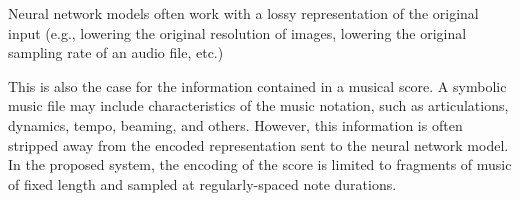 
Neural network models often work with a lossy representation
of the original input (e.g., lowering the original
resolution of images, lowering the original sampling rate of
an audio file, etc.)

This is also the case for the information contained in a
musical score. A symbolic music file may include
characteristics of the music notation, such as
articulations, dynamics, tempo, beaming, and others.
However, this information is often stripped away from the
encoded representation sent to the neural network model. In
the proposed system, the encoding of the score is limited to
fragments of music of fixed length and sampled at
regularly-spaced note durations.

